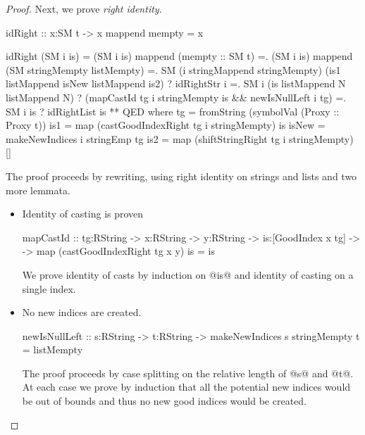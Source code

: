 \begin{proof}
Next, we prove \textit{right identity}.
\begin{code}
  idRight :: x:SM t -> {x mappend mempty = x}
  
  idRight (SM i is)
    =  (SM i is) mappend (mempty :: SM t)
    =. (SM i is) mappend (SM stringMempty listMempty)
    =. SM (i stringMappend stringMempty) (is1 listMappend isNew listMappend is2)
       ? idRightStr i
    =. SM i (is listMappend N listMappend N)
       ? (mapCastId tg i stringMempty is && newIsNullLeft i tg)
    =. SM i is
       ? idRightList is
    **  QED
    where
      tg    = fromString (symbolVal (Proxy :: Proxy t))
      is1   = map (castGoodIndexRight tg i stringMempty) is
      isNew = makeNewIndices i stringEmp tg
      is2   = map (shiftStringRight tg i stringMempty) []
\end{code}
The proof proceeds by rewriting,
using right identity on strings and lists and two more lemmata.
\begin{itemize}
\item Identity of casting is proven
\begin{code}
  mapCastId 
    :: tg:RString -> x:RString -> y:RString
    -> is:[GoodIndex x tg] ->
    -> {map (castGoodIndexRight tg x y) is = is}
\end{code}
We prove identity of casts by induction on @is@ and
identity of casting on a single index.
\item No new indices are created.
\begin{code}
  newIsNullLeft 
    :: s:RString -> t:RString
    -> {makeNewIndices s stringMempty t = listMempty}
\end{code}
The proof proceeds by case splitting
on the relative length of @s@ and @t@.
At each case we prove by induction that all
the potential new indices would be out of bounds and thus
no new good indices would be created.
\end{itemize}


\end{proof}
